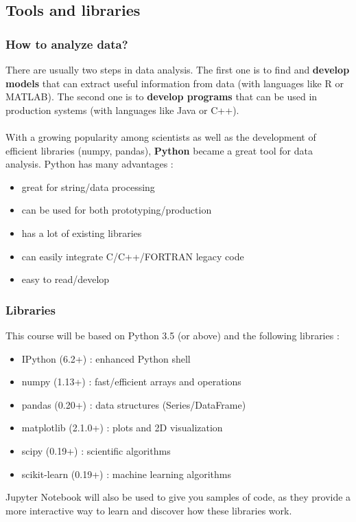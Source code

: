 \documentclass{beamer}
\begin{document}
\subsection{Tools and libraries}
\begin{frame}
  \frametitle{How to analyze data?}
  There are usually two steps in data analysis. The first one is to find and
  \textbf{develop models} that can extract useful information from data (with
  languages like R or MATLAB). The second one is to \textbf{develop programs}
  that can be used in production systems (with languages like Java or C++).
  \\~\\

  With a growing popularity among scientists as well as the development of
  efficient libraries (numpy, pandas), \textbf{Python} became a great tool for
  data analysis. Python has many advantages :
  \begin{itemize}
    \item great for string/data processing
    \item can be used for both prototyping/production
    \item has a lot of existing libraries
    \item can easily integrate C/C++/FORTRAN legacy code
    \item easy to read/develop
  \end{itemize}
\end{frame}

\begin{frame}
  \frametitle{Libraries}
  This course will be based on Python 3.5 (or above) and the following
  libraries :
  \begin{itemize}
    \item IPython (6.2+) : enhanced Python shell
    \item numpy (1.13+) : fast/efficient arrays and operations
    \item pandas (0.20+) : data structures (Series/DataFrame)
    \item matplotlib (2.1.0+) : plots and 2D visualization
    \item scipy (0.19+) : scientific algorithms
    \item scikit-learn (0.19+) : machine learning algorithms
  \end{itemize}

  Jupyter Notebook will also be used to give you samples of code, as they
  provide a more interactive way to learn and discover how these libraries
  work.
\end{frame}
\end{document}
